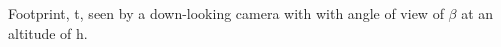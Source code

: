 \label{fig:fov} Footprint, t, seen by a down-looking camera with with angle of view of $\beta$ at an altitude of h.